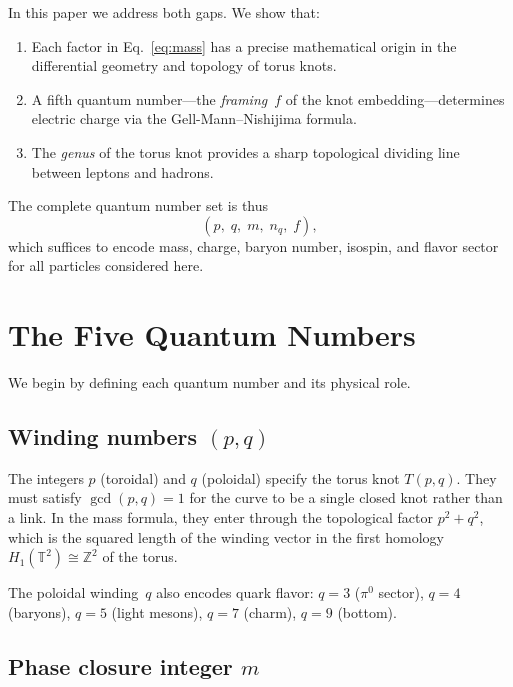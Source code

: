\documentclass[11pt,a4paper]{article}
\begin{document}
In this paper we address both gaps.  We show that:
\begin{enumerate}
\item Each factor in Eq.~\eqref{eq:mass} has a precise
  mathematical origin in the differential geometry and
  topology of torus knots.
\item A fifth quantum number---the \emph{framing}~$f$ of
  the knot embedding---determines electric charge via the
  Gell-Mann--Nishijima formula.
\item The \emph{genus} of the torus knot provides a sharp
  topological dividing line between leptons and hadrons.
\end{enumerate}

The complete quantum number set is thus
\begin{equation}
  (p,\; q,\; m,\; n_q,\; f),
  \label{eq:five}
\end{equation}
which suffices to encode mass, charge, baryon number, isospin,
and flavor sector for all particles considered here.


\section{The Five Quantum Numbers}
\label{sec:five}

We begin by defining each quantum number and its physical role.

\subsection{Winding numbers $(p,q)$}

The integers $p$ (toroidal) and $q$ (poloidal) specify the
torus knot $T(p,q)$.  They must satisfy $\gcd(p,q) = 1$
for the curve to be a single closed knot rather than a link.
In the mass formula, they enter through the topological factor
$p^2 + q^2$, which is the squared length of the winding vector
in the first homology $H_1(\mathbb{T}^2) \cong \mathbb{Z}^2$
of the torus.

The poloidal winding~$q$ also encodes quark flavor:
$q = 3$ ($\pi^0$ sector), $q = 4$ (baryons), $q = 5$
(light mesons), $q = 7$ (charm), $q = 9$ (bottom).

\subsection{Phase closure integer $m$}
\end{document}
